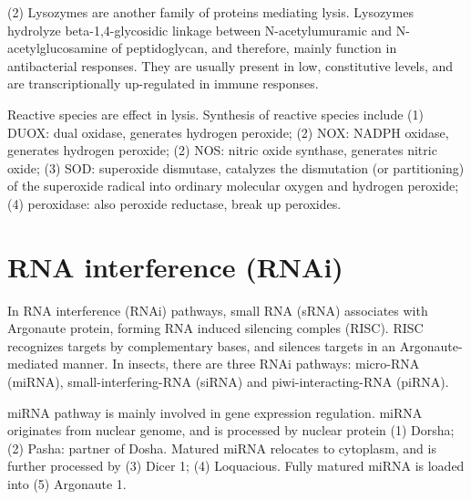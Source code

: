 \documentclass[11pt]{article}
\begin{document}
\begin{sloppypar}
\par

(2) Lysozymes \newline
are another family of proteins mediating lysis. 
Lysozymes hydrolyze beta-1,4-glycosidic linkage between N-acetylumuramic and N-acetylglucosamine of peptidoglycan, and therefore, mainly function in antibacterial responses. 
They are usually present in low, constitutive levels, and are transcriptionally up-regulated in immune responses. 

\par

Reactive species are effect in lysis. 
Synthesis of reactive species include 
\newline
(1) DUOX: dual oxidase, generates hydrogen peroxide; \newline
(2) NOX: NADPH oxidase, generates hydrogen peroxide; \newline
(2) NOS: nitric oxide synthase, generates nitric oxide; \newline
(3) SOD: superoxide dismutase, catalyzes the dismutation (or partitioning) of the superoxide radical into ordinary molecular oxygen and hydrogen peroxide; \newline
(4) peroxidase: also peroxide reductase, break up peroxides.  

\section*{RNA interference (RNAi)}
In RNA interference (RNAi) pathways, small RNA (sRNA) associates with Argonaute protein, forming RNA induced silencing comples (RISC). 
RISC recognizes targets by complementary bases, and silences targets in an Argonaute-mediated manner. 
In insects, there are three RNAi pathways: micro-RNA (miRNA), small-interfering-RNA (siRNA) and piwi-interacting-RNA (piRNA). 

\par

miRNA pathway is mainly involved in gene expression regulation. 
miRNA originates from nuclear genome, and is processed by nuclear protein 
\newline
(1) Dorsha; \newline
(2) Pasha: partner of Dosha. \newline
Matured miRNA relocates to cytoplasm, and is further processed by 
\newline
(3) Dicer 1; \newline
(4) Loquacious. \newline
Fully matured miRNA is loaded into 
\newline
(5) Argonaute 1. 


\end{sloppypar}
\end{document}
